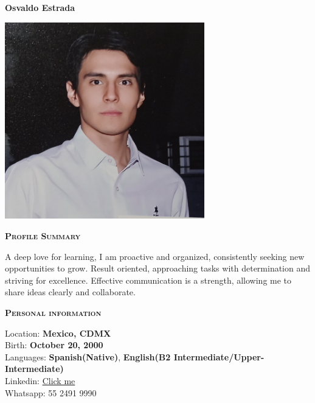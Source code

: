 \documentclass[11pt, a4paper]{article}
\newcommand{\headleft}[1]{\vspace*{3ex}\textsc{\textbf{#1}}\par%
    \vspace*{-1.5ex}\hrulefill\par\vspace*{0.7ex}}
\begin{document}
\setlength{\topskip}{0pt}
\setlength{\parindent}{0pt}
\setlength{\parskip}{0pt}
\setlength{\fboxsep}{0pt}
\pagestyle{empty}
\raggedbottom

\begin{minipage}[t]{0.33\textwidth} %
\colorbox{cvblue}{\begin{minipage}[t][5mm][t]{\textwidth}\null\hfill\null\end{minipage}}

\vspace{-.2ex} %
\colorbox{cvblue!90}{\color{white}  %
\textwidth\relax%
\begin{minipage}[t][293mm][t]{0.82\textwidth}
\raggedright
\vspace*{2.5ex}

\Large \textbf{Osvaldo Estrada} \normalsize

\null\hfill\includegraphics[width=0.65\textwidth]{osvaldo.jpg}\hfill\null

\vspace*{0.5ex} %

\headleft{Profile Summary}
A deep love for learning, I am
proactive and organized, consistently
seeking new opportunities to grow.
Result oriented, approaching tasks
with determination and striving for
excellence. Effective communication
is a strength, allowing me to share
ideas clearly and collaborate.


\headleft{Personal information}
Location: \textbf{Mexico, CDMX} \\[0.5ex]
Birth: \textbf{October 20, 2000} \\[0.5ex]
Languages: \textbf{Spanish(Native)}, \textbf{English(B2 Intermediate/Upper-Intermediate)} \\[0.5ex]
Linkedin: \href{https://www.linkedin.com/in/osvaldo-israel-estrada-sosa-19529919a/}{Click me} \\[0.5ex]
Whatsapp: 55 2491 9990


\end{minipage}}
\end{minipage}
\end{document}
